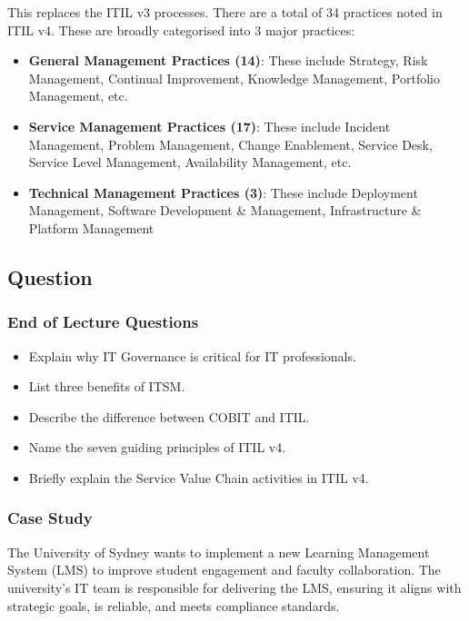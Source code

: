 \indent 

This replaces the ITIL v3 processes. There are a total of 34 practices noted in ITIL v4. These are broadly categorised into 3 major practices:

\begin{itemize}
    \item \textbf{General Management Practices (14)}: These include Strategy, Risk Management, Continual Improvement, Knowledge Management, Portfolio Management, etc.
    \item \textbf{Service Management Practices (17)}: These include Incident Management, Problem Management, Change Enablement, Service Desk, Service Level Management, Availability Management, etc.
    \item \textbf{Technical Management Practices (3)}: These include Deployment Management, Software Development \& Management, Infrastructure \& Platform Management
\end{itemize}

\subsection{Question}

\subsubsection{End of Lecture Questions}

\begin{itemize}
    \item Explain why IT Governance is critical for IT professionals.
    \item List three benefits of ITSM.
    \item Describe the difference between COBIT and ITIL.
    \item Name the seven guiding principles of ITIL v4.
    \item Briefly explain the Service Value Chain activities in ITIL v4.
\end{itemize}

\subsubsection{Case Study}

\indent 

The University of Sydney wants to implement a new Learning Management System (LMS) to improve student engagement and faculty collaboration. The university’s IT team is responsible for delivering the LMS, ensuring it aligns with strategic goals, is reliable, and meets compliance standards.


